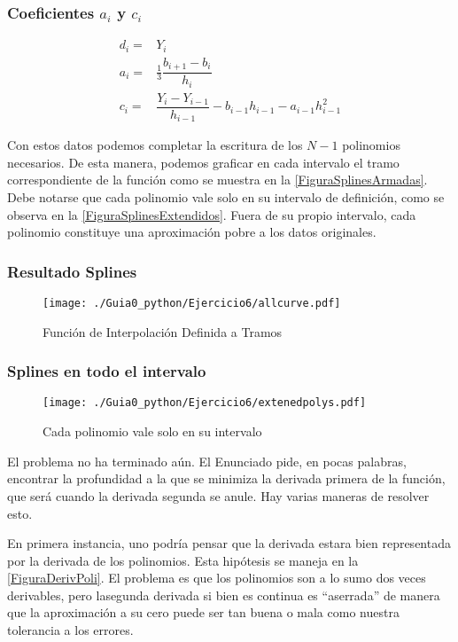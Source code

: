 \begin{frame}[label=FrameEquationRecurrencias]
  \frametitle<presentation>{Coeficientes $a_i$ y $c_i$}
  \begin{equation}
    \begin{aligned}
      d_i =& Y_i \\
      a_i =& \frac{1}{3} \dfrac{ b_{i+1} - b_i }{h_i} \\
      c_i =& \dfrac{ Y_i - Y_{i-1} }{ h_{i-1} } - b_{i-1} h_{i-1}  - a_{i-1} h_{i-1} ^2
    \end{aligned}
  \end{equation}


\end{frame}
Con estos datos podemos completar la escritura de los $N-1$ polinomios
necesarios. De esta manera, podemos graficar en cada intervalo 
el tramo correspondiente de la función como se muestra en la
\autoref{FiguraSplinesArmadas}. Debe notarse que cada polinomio vale solo
en su intervalo de definición, como se observa en la \autoref{FiguraSplinesExtendidos}.
Fuera de su propio intervalo, cada polinomio constituye una aproximación pobre
a los datos originales. 

\mode*
\begin{frame}[label=FrameFiguraSplinesArmadas]
  \frametitle<presentation>{Resultado Splines}
  \begin{figure}
    \center
    \texttt{[image: ./Guia0\_python/Ejercicio6/allcurve.pdf]}
    \caption{\label{FiguraSplinesArmadas}Función de Interpolación Definida a Tramos}
  \end{figure}
\end{frame}

\begin{frame}[label=FrameFiguraSplinesExtendidos]
  \frametitle<presentation>{Splines en todo el intervalo}
  \begin{figure}
    \center
    \texttt{[image: ./Guia0\_python/Ejercicio6/extenedpolys.pdf]}
    \caption{\label{FiguraSplinesExtendidos} Cada polinomio vale solo en su intervalo}
  \end{figure}
\end{frame}

El problema no ha terminado aún. El Enunciado pide, en pocas palabras,
encontrar la profundidad a la que se minimiza la derivada primera
de la función, que será cuando la derivada segunda se anule.
Hay varias maneras de resolver esto. 

En primera instancia, uno podría pensar que la derivada estara bien
representada por la derivada de los polinomios. Esta hipótesis se 
maneja en la \autoref{FiguraDerivPoli}. El problema es que los
polinomios son a lo sumo dos veces derivables, pero lasegunda derivada
si bien es continua es ``aserrada'' de manera que la aproximación
a su cero puede ser tan buena o mala como nuestra tolerancia a
los errores.


